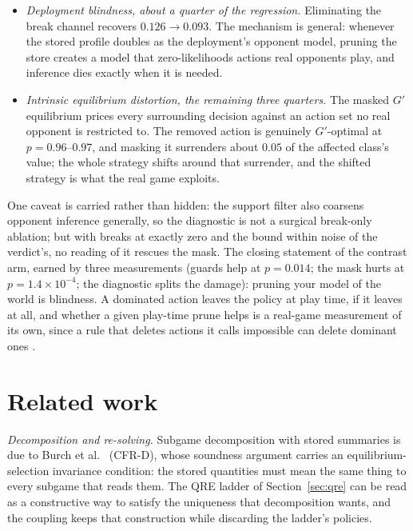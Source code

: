 \documentclass[11pt]{article}
\theoremstyle{plain}
\theoremstyle{definition}
\theoremstyle{remark}
\newcommand{\gp}{\ensuremath{G'}}
\begin{document}
\begin{itemize}\itemsep2pt
  \item \emph{Deployment blindness, about a quarter of the regression.}
        Eliminating the break channel recovers $0.126 \to 0.093$. The
        mechanism is general: whenever the stored profile doubles as
        the deployment's opponent model, pruning the store creates a
        model that zero-likelihoods actions real opponents play, and
        inference dies exactly when it is needed.
  \item \emph{Intrinsic equilibrium distortion, the remaining three
        quarters.} The masked $\gp$ equilibrium prices every
        surrounding decision against an action set no real opponent is
        restricted to. The removed action is genuinely $\gp$-optimal at
        $p=0.96$--$0.97$, and masking it surrenders about $0.05$ of the
        affected class's value; the whole strategy shifts around that
        surrender, and the shifted strategy is what the real game
        exploits.
\end{itemize}

One caveat is carried rather than hidden: the support filter also
coarsens opponent inference generally, so the diagnostic is not a
surgical break-only ablation; but with breaks at exactly zero and the
bound within noise of the verdict's, no reading of it rescues the
mask. The closing statement of the contrast arm, earned by three
measurements (guards help at $p=0.014$; the mask hurts at
$p=1.4\times10^{-4}$; the diagnostic splits the damage): pruning your
model of the world is blindness. A dominated action leaves the policy at
play time, if it leaves at all, and whether a given play-time prune
helps is a real-game measurement of its own, since a rule that deletes
actions it calls impossible can delete dominant ones \cite{rb2}.

\section{Related work}\label{sec:related}

\emph{Decomposition and re-solving.} Subgame decomposition with stored
summaries is due to Burch et al.\ \cite{burch2014} (CFR-D), whose
soundness argument carries an equilibrium-selection invariance
condition: the stored quantities must mean the same thing to every
subgame that reads them. The QRE ladder of Section~\ref{sec:qre} can be
read as a constructive way to satisfy the uniqueness that decomposition
wants, and the coupling keeps that construction while discarding the
ladder's policies.
\end{document}
